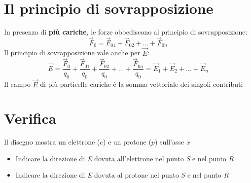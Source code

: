 \documentclass{book}
\begin{document}
\section{Il principio di sovrapposizione}
In presenza di \textbf{più cariche}, le forze obbediscono al principio di sovrapposizione:
\begin{equation}
  \vec{F}_0=\vec{F}_{01}+\vec{F}_{02}+\dots+\vec{F}_{0n}
\end{equation}
Il principio di sovrapposizione vale anche per $\vec{E}$:
\begin{equation}
  \vec{E}=\frac{\vec{F}_0}{q_0}+\frac{\vec{F}_{01}}{q_0}+\frac{\vec{F}_{02}}{q_0}+\dots+\frac{\vec{F}_{0n}}{q_0}=\vec{E}_1+\vec{E}_2+\dots+\vec{E}_n
\end{equation}
Il campo $\vec{E}$ di più particelle cariche è la somma vettoriale dei singoli contributi
\section{Verifica}
\begin{center}
\end{center}
Il disegno mostra un elettrone ($e$) e un protone ($p$) sull'asse $x$
\begin{itemize}
	\item Indicare la direzione di \textit{E} dovuta all’elettrone nel
           punto \textit{S} e nel punto \textit{R}
        \item Indicare la direzione di \textit{E} dovuta al protone nel
punto \textit{S} e nel punto \textit{R}
\end{itemize}
\end{document}
